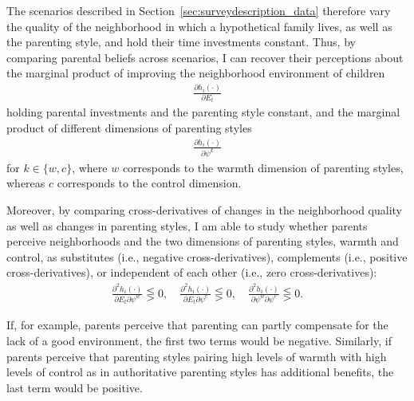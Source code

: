 \documentclass[12pt, a4paper, english]{article}
\begin{document}
The scenarios described in Section~\ref{sec:surveydescription_data} therefore vary the quality of the neighborhood in which a hypothetical family lives, as well as the parenting style, and hold their time investments constant. Thus, by comparing parental beliefs across scenarios, I can recover their perceptions about the marginal product of improving the neighborhood environment of children
\begin{align}
   \frac{\partial h_i(\cdot)}{\partial E_t}
\end{align}
holding parental investments and the parenting style constant, and the marginal product of different dimensions of parenting styles
\begin{align}
   \frac{\partial h_i(\cdot)}{\partial \psi^k}
\end{align}
for $k\in\{w,c\}$, where $w$ corresponds to the warmth dimension of parenting styles, whereas $c$ corresponds to the control dimension.

Moreover, by comparing cross-derivatives of changes in the neighborhood quality as well as changes in parenting styles, I am able to study whether parents perceive neighborhoods and the two dimensions of parenting styles, warmth and control, as substitutes (i.e., negative cross-derivatives), complements (i.e., positive cross-derivatives), or independent of each other (i.e., zero cross-derivatives):
\begin{align}
    \frac{\partial^2 h_i(\cdot)}{\partial E_t \partial\psi^w}
    \lesseqgtr 0, \quad
    \frac{\partial^2 h_i(\cdot)}{\partial E_t \partial\psi^c}
    \lesseqgtr 0, \quad
    \frac{\partial^2 h_i(\cdot)}{\partial \psi^w \partial \psi^c}
    \lesseqgtr 0.
\end{align}

If, for example, parents perceive that parenting can partly compensate for the lack of a good environment, the first two terms would be negative. Similarly, if parents perceive that parenting styles pairing high levels of warmth with high levels of control as in authoritative parenting styles has additional benefits, the last term would be positive.
\end{document}
